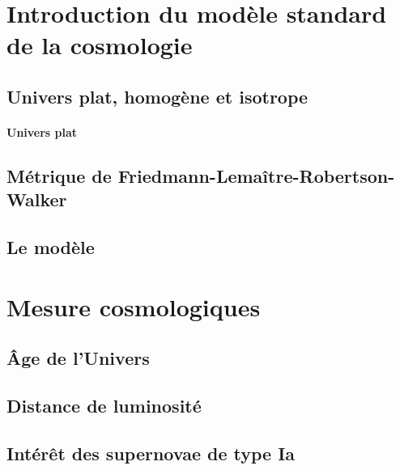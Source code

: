 \documentclass[../main/main.tex]{subfiles}
\begin{document}
\section{Introduction du modèle standard de la cosmologie}\label{sec:MS}

\subsection{Univers plat, homogène et isotrope}\label{ssec:plat}

\paragraph*{Univers plat}
\lipsum[1]

\subsection{Métrique de Friedmann-Lemaître-Robertson-Walker}\label{ssec:FLRW}

\subsection{Le modèle \lcdm}\label{ssec:LCDM}

\section{Mesure cosmologiques}\label{sec:dist}

\subsection{Âge de l'Univers}\label{ssec:age}

\subsection{Distance de luminosité}\label{ssec:dl}

\subsection{Intérêt des supernovae de type Ia}\label{ssec:intsne}

\lipsum[2-4]
\end{document}
